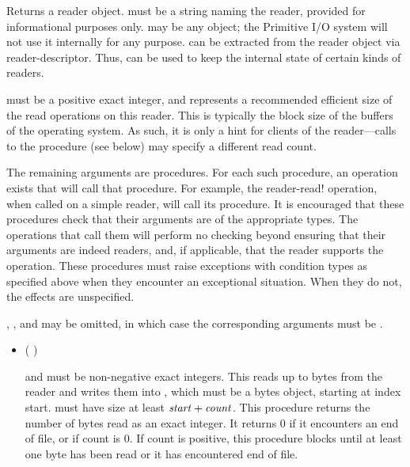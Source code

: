 \begin{entry}{%
}

Returns a reader object.  must be a string naming the reader,
provided for informational purposes only.  may be any
object; the Primitive I/O system will not use it internally for any
purpose.  can be extracted from the reader object via
{\cf reader-descriptor}. Thus,  can be used to keep the
internal state of certain kinds of readers.
   
 must be a positive exact integer, and represents a recommended
efficient size of the read operations on this reader. This is typically the
block size of the buffers of the operating system. As such, it is only a
hint for clients of the reader---calls to the  procedure (see below)
may specify a different read count.
   
The remaining arguments are procedures.  For each such procedure, an
operation exists that will call that procedure.  For example, the {\cf
  reader-read!} operation, when called on a simple reader, will call
its  procedure.
It is encouraged that these procedures check that their arguments are
of the appropriate types.  The operations that call them will perform
no checking beyond ensuring that their  arguments are
indeed readers, and, if applicable, that the reader supports the operation.
These procedures must raise
exceptions with condition types as specified above when they encounter an
exceptional situation. When they do not, the effects are unspecified.

, , and  may be
omitted, in which case the corresponding arguments must be \schfalse.
   
\begin{itemize}
\item {\cf (   )}
       
   and  must be non-negative exact integers.
  This reads up to  bytes from the reader and writes them
  into , which must be a bytes object, starting at index
  start.  must have size at least $\var{start} +
  \var{count}$. This procedure returns the number of bytes read as an
  exact integer. It returns 0 if it encounters an end of file, or if
  count is 0. If count is positive, this procedure blocks until at
  least one byte has been read or it has encountered end of file.
  

\end{itemize}
\end{entry}
